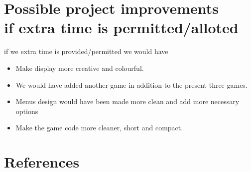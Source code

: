 \documentclass[12pt,letterpaper]{article}
\begin{document}
\section{Possible project improvements \\if extra time is permitted/alloted}
if we extra time is provided/permitted we would have
\begin{itemize}
    \item Make display more creative and colourful.
    \item We would have added another game in addition to the present three games.
    \item Menus design would have been made more clean and add more necessary options
    \item Make the game code more cleaner, short and compact.
\end{itemize}
\section{References}


\end{document}
